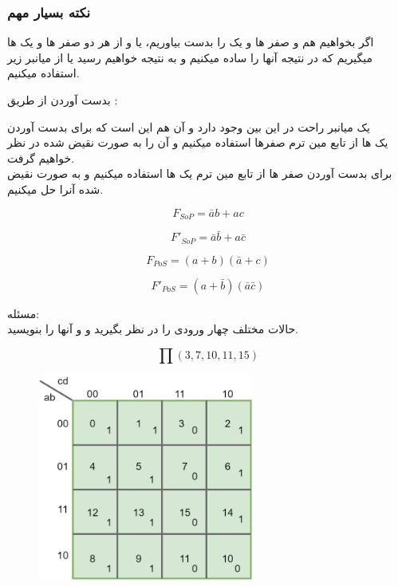\documentclass[20pt, a4paper]{article}
\begin{document}
\subsubsection{نکته بسیار مهم}

اگر بخواهیم هم
و
صفر ها و یک را بدست بیاوریم، یا 
و
از هر دو صفر ها و یک ها میگیریم که در نتیجه آنها را ساده میکنیم و به نتیجه خواهیم رسید یا از 
میانبر زیر استفاده میکنیم.


بدست آوردن 
از طریق
:

یک میانبر راحت در این بین وجود دارد و آن هم این است که برای بدست آوردن
\\
یک ها از تابع مین ترم صفرها استفاده میکنیم و آن را به صورت نقیض شده در نظر خواهیم گرفت.\\

برای بدست آوردن
صفر ها از تابع مین ترم یک ها استفاده میکنیم و به صورت نقیض شده آنرا حل میکنیم.


\begin{equation}
	F_{SoP} = \bar{a}b + ac
\end{equation}

\begin{equation}
	F'_{SoP} =  \bar{a}\bar{b} + a\bar{c}
\end{equation}

\begin{equation}
	F_{PoS} = (a+b) (\bar{a}+c)
\end{equation}

\begin{equation}
	F'_{PoS} = (a+\bar{b})(\bar{a}\bar{c})
\end{equation}

\newpage

مسئله:\\
حالات مختلف چهار ورودی را در نظر بگیرید و
و
آنها را بنویسید.

\begin{equation}
	\prod (3, 7, 10, 11, 15)
\end{equation}


\begin{figure}[htbp]\centering
	\centerline{\includegraphics[width=200pt]{img/karnoughMap/sop_pos_karnough-Page-2.png}}
\end{figure}
\end{document}
